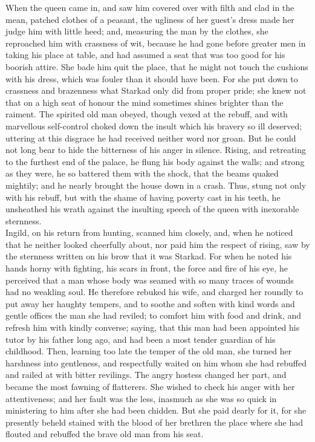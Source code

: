 \documentclass[10pt,a4paper]{report}
\begin{document}
When the queen came in, and saw him covered over with filth and clad in the mean, patched clothes of a peasant, the ugliness of her guest's dress made her judge him with little heed; and, measuring the man by the clothes, she reproached him with crassness of wit, because he had gone before greater men in taking his place at table, and had assumed a seat that was too good for his boorish attire. She bade him quit the place, that he might not touch the cushions with his dress, which was fouler than it should have been. For she put down to crassness and brazenness what Starkad only did from proper pride; she knew not that on a high seat of honour the mind sometimes shines brighter than the raiment. The spirited old man obeyed, though vexed at the rebuff, and with marvellous self-control choked down the insult which his bravery so ill deserved; uttering at this disgrace he had received neither word nor groan. But he could not long bear to hide the bitterness of his anger in silence. Rising, and retreating to the furthest end of the palace, he flung his body against the walls; and strong as they were, he so battered them with the shock, that the beams quaked mightily; and he nearly brought the house down in a crash. Thus, stung not only with his rebuff, but with the shame of having poverty cast in his teeth, he unsheathed his wrath against the insulting speech of the queen with inexorable sternness.\\

Ingild, on his return from hunting, scanned him closely, and, when he noticed that he neither looked cheerfully about, nor paid him the respect of rising, saw by the sternness written on his brow that it was Starkad. For when he noted his hands horny with fighting, his scars in front, the force and fire of his eye, he perceived that a man whose body was seamed with so many traces of wounds had no weakling soul. He therefore rebuked his wife, and charged her roundly to put away her haughty tempers, and to soothe and soften with kind words and gentle offices the man she had reviled; to comfort him with food and drink, and refresh him with kindly converse; saying, that this man had been appointed his tutor by his father long ago, and had been a most tender guardian of his childhood. Then, learning too late the temper of the old man, she turned her harshness into gentleness, and respectfully waited on him whom she had rebuffed and railed at with bitter revilings. The angry hostess changed her part, and became the most fawning of flatterers. She wished to check his anger with her attentiveness; and her fault was the less, inasmuch as she was so quick in ministering to him after she had been chidden. But she paid dearly for it, for she presently beheld stained with the blood of her brethren the place where she had flouted and rebuffed the brave old man from his seat.\\
\end{document}
